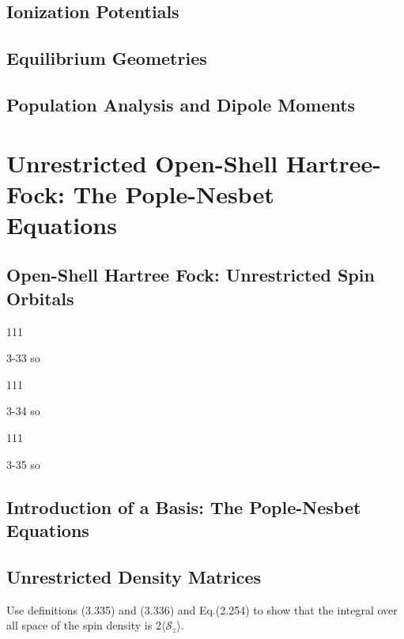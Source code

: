 \documentclass[a4paper]{book}
\begin{document}
	\subsection{Ionization Potentials}
	
	\subsection{Equilibrium Geometries}
	
	\subsection{Population Analysis and Dipole Moments}
	
	\section{Unrestricted Open-Shell Hartree-Fock: The Pople-Nesbet \texorpdfstring{\\}- Equations}
	
	\subsection{Open-Shell Hartree Fock: Unrestricted Spin Orbitals}
	
	\begin{exercise}
	111
	\end{exercise}
	
	\begin{solution}
		3-33 so
	\end{solution}
	
	\begin{exercise}
	111
	\end{exercise}
	
	\begin{solution}
		3-34 so
	\end{solution}
	
	\begin{exercise}
	111
	\end{exercise}
	
	\begin{solution}
		3-35 so
	\end{solution}
	
	\subsection{Introduction of a Basis: The Pople-Nesbet Equations}
	
	\subsection{Unrestricted Density Matrices}
	\begin{exercise}
	Use definitions (3.335) and (3.336) and Eq.(2.254) to show that the integral over all space of the spin density is 2$\langle \mathscr{S}_z \rangle$.
	\end{exercise}
	
\end{document}
